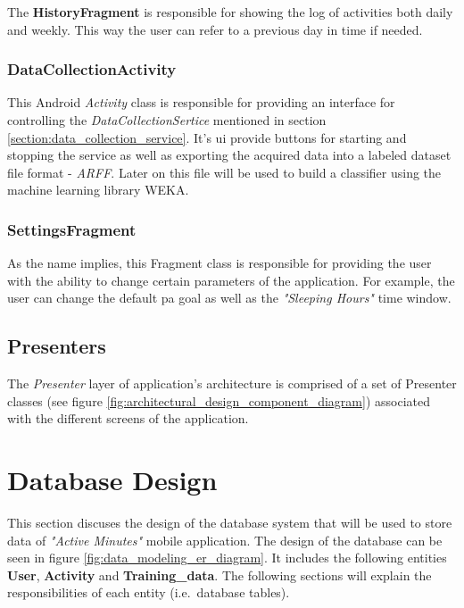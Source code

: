             The \textbf{HistoryFragment} is responsible for showing the log of activities both daily and weekly. This way the user can refer to a previous day in time if needed.
            
            \subsubsection{DataCollectionActivity}
            This Android \textit{Activity} class is responsible for providing an interface for controlling the \textit{DataCollectionSertice} mentioned in section \ref{section:data_collection_service}. It's \gls{ui} provide buttons for starting and stopping the service as well as exporting the acquired data into a labeled dataset file format - \textit{ARFF}. Later on this file will be used to build a classifier using the machine learning library WEKA.
            
            \subsubsection{SettingsFragment}
            As the name implies, this Fragment class is responsible for providing the user with the ability to change certain parameters of the application. For example, the user can change the default \gls{pa} goal as well as the \textit{"Sleeping Hours"} time window.
            
            
        \subsection{Presenters}
        The \textit{Presenter} layer of application's architecture is comprised of a set of Presenter classes (see figure  \ref{fig:architectural_design_component_diagram}) associated with the different screens of the application.
    
    \section{Database Design}
    This section discuses the design of the database system that will be used to store data of \textit{"Active Minutes"} mobile application. The design of the database can be seen in figure \ref{fig:data_modeling_er_diagram}. It includes the following entities \textbf{User}, \textbf{Activity} and \textbf{Training\_data}. The following sections will explain the responsibilities of each entity (i.e.\ database tables).
        
